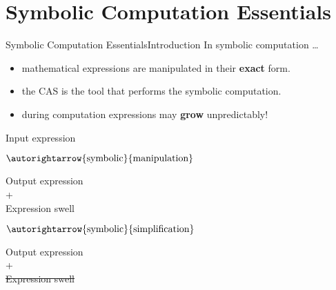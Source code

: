 
\section{Symbolic Computation Essentials}

\begin{frame}{Symbolic Computation Essentials}{Introduction}
  In symbolic computation \dots
  \begin{itemize}
    \item mathematical expressions are manipulated in their \textbf{exact} form.
    \item the \ac{CAS} is the tool that performs the symbolic computation.
    \item during computation expressions may \textbf{grow} unpredictably! %
  \end{itemize}
  \begin{center}\begin{minipage}{\textwidth}\begin{bbox}
    \centering%
    \begin{minipage}[c]{0.15\textwidth} \centering Input expression \end{minipage}%
    \begin{minipage}[c]{0.19\textwidth} \centering $\autorightarrow{\text{symbolic}}{\text{manipulation}}$ \end{minipage}%
    \begin{minipage}[c]{0.21\textwidth} \centering Output expression \\ + \\ Expression swell \end{minipage}%
    \begin{minipage}[c]{0.19\textwidth} \centering $\autorightarrow{\text{symbolic}}{\text{simplification}}$ \end{minipage}%
    \begin{minipage}[c]{0.21\textwidth} \centering Output expression \\ + \\ \textcolor{fg_sl_color!25}{\sout{Expression swell} }\end{minipage}%
  \end{bbox}\end{minipage}\end{center}
\end{frame}

